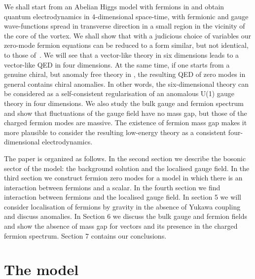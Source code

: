\documentclass[a4paper,12pt]{article}
\begin{document}
We shall start from an Abelian Higgs model with fermions in \coordHE{} and
obtain quantum electrodynamics in 4-dimensional space-time, with
fermionic and gauge wave-functions spread in transverse direction in
a small region in the vicinity of the core of the vortex.  We shall
show that with a judicious choice of variables our zero-mode fermion
equations can be reduced to a form similar, but not identical, to
those of~\cite{Jackiw:1981ee}. We will see that a vector-like theory
in six dimensions leads to a vector-like QED in four dimensions. At
the same time, if one starts from a genuine chiral, but anomaly free
theory in \coordHE{}, the resulting \coordHE{} QED of zero modes in general
contains chiral anomalies. In other words, the six-dimensional theory
can be considered as a self-consistent regularisation of an anomalous
U(1) gauge theory in four dimensions. We also study  the bulk gauge
and fermion spectrum and show that fluctuations of the gauge field
have no mass gap, but those of the charged fermion modes are
massive. The existence of fermion mass gap makes it more plausible to
consider the resulting low-energy theory as a consistent
four-dimensional electrodynamics. 

The paper is organized as follows. In the second section we describe
the bosonic sector of the model: the background solution and the
localised gauge field. In the third section we construct fermion zero
modes for a model in which there is an interaction between fermions
and a scalar. In the fourth section we find interaction between
fermions and the localised gauge field. In section 5 we will consider
localisation of fermions by gravity in the absence of Yukawa coupling
and discuss anomalies. In Section 6 we discuss the bulk gauge and
fermion fields and show the absence of mass gap for vectors and its
presence in the charged fermion spectrum. Section 7 contains our 
conclusions.

\section{The model}
\end{document}
